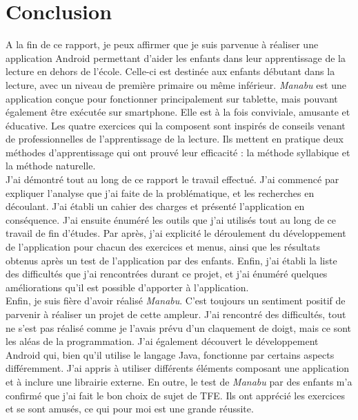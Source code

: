 \section{Conclusion}
A la fin de ce rapport, je peux affirmer que je suis parvenue à réaliser une application Android permettant d'aider les enfants dans leur apprentissage de la lecture en dehors de l'école. Celle-ci est destinée aux enfants débutant dans la lecture, avec un niveau de première primaire ou même inférieur. \textit{Manabu} est une application conçue pour fonctionner principalement sur tablette, mais pouvant également être exécutée sur smartphone. Elle est à la fois conviviale, amusante et éducative. Les quatre exercices qui la composent sont inspirés de conseils venant de professionnelles de l'apprentissage de la lecture. Ils mettent en pratique deux méthodes d'apprentissage qui ont prouvé leur efficacité : la méthode syllabique et la méthode naturelle.\\

J'ai démontré tout au long de ce rapport le travail effectué. J'ai commencé par expliquer l'analyse que j'ai faite de la problématique, et les recherches en découlant. J'ai établi un cahier des charges et présenté l'application en conséquence. J'ai ensuite énuméré les outils que j'ai utilisés tout au long de ce travail de fin d'études. Par après, j'ai explicité le déroulement du développement de l'application pour chacun des exercices et menus, ainsi que les résultats obtenus après un test de l'application par des enfants. Enfin, j'ai établi la liste des difficultés que j'ai rencontrées durant ce projet, et j'ai énuméré quelques améliorations qu'il est possible d'apporter à l'application.\\

Enfin, je suis fière d'avoir réalisé \textit{Manabu}. C'est toujours un sentiment positif de parvenir à réaliser un projet de cette ampleur. J'ai rencontré des difficultés, tout ne s'est pas réalisé comme je l'avais prévu d'un claquement de doigt, mais ce sont les aléas de la programmation. J'ai également découvert le développement Android qui, bien qu'il utilise le langage Java, fonctionne par certains aspects différemment. J'ai appris à utiliser différents éléments composant une application et à inclure une librairie externe. En outre, le test de \textit{Manabu} par des enfants m'a confirmé que j'ai fait le bon choix de sujet de TFE. Ils ont apprécié les exercices et se sont amusés, ce qui pour moi est une grande réussite. 